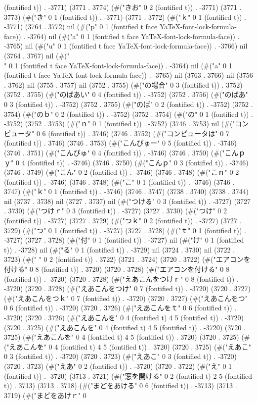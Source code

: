 (fontified t)) . -3771) (3771 . 3774) (#("きお" 0 2 (fontified t)) . -3771) (3771 . 3773) (#("き" 0 1 (fontified t)) . -3771) (3771 . 3772) (#("ｋ" 0 1 (fontified t)) . -3771) (3764 . 3772) nil (#("p" 0 1 (fontified t face YaTeX-font-lock-formula-face)) . -3764) nil (#("a" 0 1 (fontified t face YaTeX-font-lock-formula-face)) . -3765) nil (#("u" 0 1 (fontified t face YaTeX-font-lock-formula-face)) . -3766) nil (3764 . 3767) nil (#("\\" 0 1 (fontified t face YaTeX-font-lock-formula-face)) . -3764) nil (#("a" 0 1 (fontified t face YaTeX-font-lock-formula-face)) . -3765) nil (3763 . 3766) nil (3756 . 3762) nil (3755 . 3757) nil (3752 . 3755) (#("の場合" 0 3 (fontified t)) . 3752) (3752 . 3755) (#("のばあい" 0 4 (fontified t)) . -3752) (3752 . 3756) (#("のばあ" 0 3 (fontified t)) . -3752) (3752 . 3755) (#("のば" 0 2 (fontified t)) . -3752) (3752 . 3754) (#("のｂ" 0 2 (fontified t)) . -3752) (3752 . 3754) (#("の" 0 1 (fontified t)) . -3752) (3752 . 3753) (#("ｎ" 0 1 (fontified t)) . -3752) (3746 . 3753) nil (#("コンピュータ" 0 6 (fontified t)) . 3746) (3746 . 3752) (#("コンピュータは" 0 7 (fontified t)) . 3746) (3746 . 3753) (#("こんぴゅー" 0 5 (fontified t)) . -3746) (3746 . 3751) (#("こんぴゅ" 0 4 (fontified t)) . -3746) (3746 . 3750) (#("こんｐｙ" 0 4 (fontified t)) . -3746) (3746 . 3750) (#("こんｐ" 0 3 (fontified t)) . -3746) (3746 . 3749) (#("こん" 0 2 (fontified t)) . -3746) (3746 . 3748) (#("こｎ" 0 2 (fontified t)) . -3746) (3746 . 3748) (#("こ" 0 1 (fontified t)) . -3746) (3746 . 3747) (#("ｋ" 0 1 (fontified t)) . -3746) (3746 . 3747) (3738 . 3740) (3738 . 3744) nil (3737 . 3738) nil (3727 . 3737) nil (#("つける" 0 3 (fontified t)) . -3727) (3727 . 3730) (#("つけｒ" 0 3 (fontified t)) . -3727) (3727 . 3730) (#("つけ" 0 2 (fontified t)) . -3727) (3727 . 3729) (#("つｋ" 0 2 (fontified t)) . -3727) (3727 . 3729) (#("つ" 0 1 (fontified t)) . -3727) (3727 . 3728) (#("ｔ" 0 1 (fontified t)) . -3727) (3727 . 3728) (#("付" 0 1 (fontified t)) . -3727) nil (#("け" 0 1 (fontified t)) . -3728) nil (#("る" 0 1 (fontified t)) . -3729) nil (3724 . 3730) nil (3722 . 3723) (#("  " 0 2 (fontified t)) . 3722) (3721 . 3724) (3720 . 3722) (#("エアコンを付ける" 0 8 (fontified t)) . 3720) (3720 . 3728) (#("エアコンを付ける" 0 8 (fontified t)) . -3720) (3720 . 3728) (#("えあこんをつけｒ" 0 8 (fontified t)) . -3720) (3720 . 3728) (#("えあこんをつけ" 0 7 (fontified t)) . -3720) (3720 . 3727) (#("えあこんをつｋ" 0 7 (fontified t)) . -3720) (3720 . 3727) (#("えあこんをつ" 0 6 (fontified t)) . -3720) (3720 . 3726) (#("えあこんをｔ" 0 6 (fontified t)) . -3720) (3720 . 3726) (#("えあこんを" 0 4 (fontified t) 4 5 (fontified t)) . -3720) (3720 . 3725) (#("えあこんを" 0 4 (fontified t) 4 5 (fontified t)) . -3720) (3720 . 3725) (#("えあこんを" 0 4 (fontified t) 4 5 (fontified t)) . 3720) (3720 . 3725) (#("えあこんを" 0 4 (fontified t) 4 5 (fontified t)) . 3720) (3720 . 3725) (#("えあこ" 0 3 (fontified t)) . -3720) (3720 . 3723) (#("えあこ" 0 3 (fontified t)) . -3720) (3720 . 3723) (#("えあ" 0 2 (fontified t)) . -3720) (3720 . 3722) (#("え" 0 1 (fontified t)) . -3720) (3713 . 3721) (#("窓を開ける" 0 2 (fontified t) 2 5 (fontified t)) . 3713) (3713 . 3718) (#("まどをあける" 0 6 (fontified t)) . -3713) (3713 . 3719) (#("まどをあけｒ" 0 